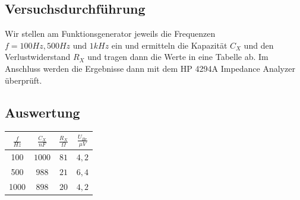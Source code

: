 \documentclass{article}
\begin{document}
\subsection{Versuchsdurchführung}
Wir stellen am Funktionsgenerator jeweils die Frequenzen $f= 100Hz, 500Hz\text{ und }1kHz$ ein und ermitteln die Kapazität $C_X$ und den Verlustwiderstand $R_X$
und tragen dann die Werte in eine Tabelle ab. Im Anschluss werden die Ergebnisse dann mit dem HP 4294A Impedance Analyzer überprüft.

\subsection{Auswertung}

\begin{center}
  \begin{tabular}{|c|c|c|c|}
    \hline
    $\frac{f}{Hz}$ & $\frac{C_X}{nF}$ & $\frac{R_X}{\Omega}$ & $\frac{U_{Br}}{\mu V}$ \\
    \hline
    100            & $1000$           & $81$                 & $4,2$                  \\
    \hline
    500            & $988$            & $21$                 & $6,4$                  \\
    \hline
    1000           & $898$            & $20$                 & $4,2$                  \\
    \hline
  \end{tabular}
\end{center}
\end{document}
